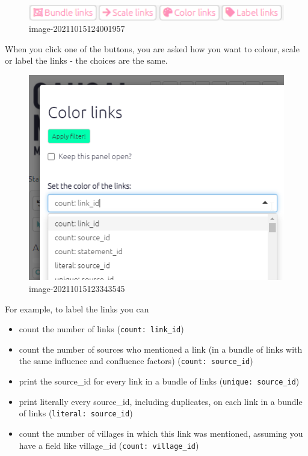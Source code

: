 \documentclass[
]{book}
\providecommand{\tightlist}{%
  \setlength{\itemsep}{0pt}\setlength{\parskip}{0pt}}
\begin{document}
\begin{figure}
\centering
\includegraphics[width=6.77083in,height=\textheight]{_assets/image-20211015124001957.png}
\caption{image-20211015124001957}
\end{figure}

When you click one of the buttons, you are asked how you want to colour, scale or label the links - the choices are the same.

\begin{figure}
\centering
\includegraphics[width=6.77083in,height=\textheight]{_assets/image-20211015123343545.png}
\caption{image-20211015123343545}
\end{figure}

For example, to label the links you can

\begin{itemize}
\tightlist
\item
  count the number of links (\texttt{count:\ link\_id})
\item
  count the number of sources who mentioned a link (in a bundle of links with the same influence and confluence factors) (\texttt{count:\ source\_id})
\item
  print the source\_id for every link in a bundle of links (\texttt{unique:\ source\_id})
\item
  print literally every source\_id, including duplicates, on each link in a bundle of links (\texttt{literal:\ source\_id})
\item
  count the number of villages in which this link was mentioned, assuming you have a field like village\_id (\texttt{count:\ village\_id})
\end{itemize}
\end{document}
